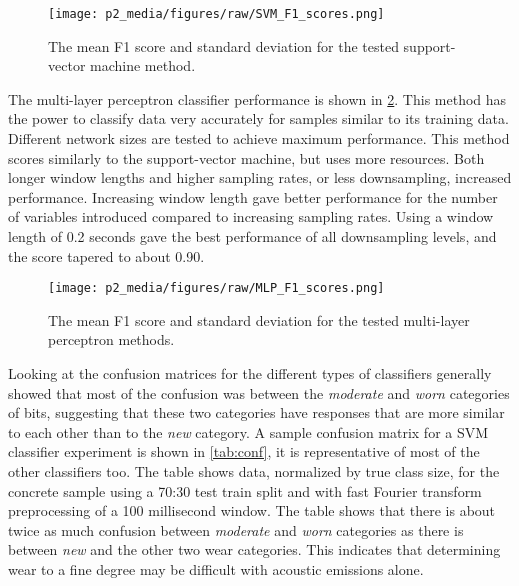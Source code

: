 \begin{figure}[h]
\centering
\texttt{[image: p2\_media/figures/raw/SVM\_F1\_scores.png]}
\caption{The mean F1 score and standard deviation for the tested support-vector machine method.
}
\label{fig:perf_SVM}
\end{figure}

The multi-layer perceptron classifier performance is shown in \ref{fig:perf_MLP}.
This method has the power to classify data very accurately for samples similar to its training data.
Different network sizes are tested to achieve maximum performance.
This method scores similarly to the support-vector machine, but uses more resources.
Both longer window lengths and higher sampling rates, or less downsampling, increased performance.
Increasing window length gave better performance for the number of variables introduced
compared to increasing sampling rates.
Using a window length of 0.2 seconds gave the best performance of all downsampling levels,
and the score tapered to about 0.90.

\begin{figure}[h]
\centering
\texttt{[image: p2\_media/figures/raw/MLP\_F1\_scores.png]}
\caption{
The mean F1 score and standard deviation for the tested multi-layer perceptron methods.
}
\label{fig:perf_MLP}
\end{figure}


Looking at the confusion matrices for the different types of classifiers generally showed
that most of the confusion was between the \textit{moderate} and \textit{worn} categories of bits, suggesting that
these two categories have responses that are more similar to each other than to the \textit{new} category.
A sample confusion matrix for a SVM classifier experiment is shown in \ref{tab:conf}, 
it is representative of most of the other classifiers too. 
The table shows data, normalized by true class size, for the concrete sample using a 70:30 test train split
and with fast Fourier transform preprocessing of a 100 millisecond window.
The table shows that there is about twice as much confusion between \textit{moderate} and \textit{worn} categories as there is 
between \textit{new} and the other two wear categories.
This indicates that determining wear to a fine degree may be difficult with acoustic emissions alone.

